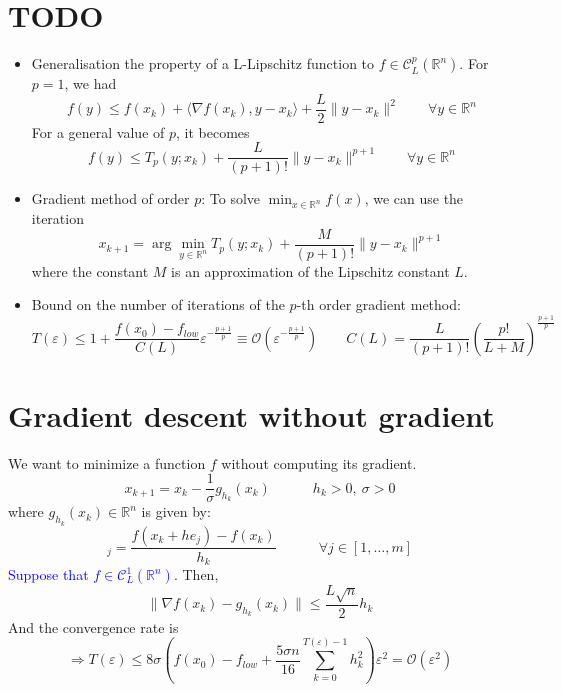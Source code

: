 \documentclass[12pt, openany]{report}
\newcommand{\R}{\mathbb{R}}
\newcommand{\C}{\mathcal{C}}
\renewcommand{\O}{\mathcal{O}}
\theoremstyle{definition}
\begin{document}
\section{TODO}
\begin{itemize}
	\item Generalisation the property of a L-Lipschitz function to $f\in \C_L^p(\R^n)$. For $p=1$, we had 
	\begin{equation}
		f(y)\le f(x_k) + \langle \nabla f(x_k),y-x_k\rangle + \frac{L}{2}\lVert y-x_k\rVert^2 \qquad \forall y\in \R^n 
	\end{equation}
	For a general value of $p$, it becomes 
	\begin{equation}
		f(y) \le T_p(y;x_k) + \frac{L}{(p+1)!}\lVert y-x_k\rVert^{p+1} \qquad \forall y\in \R^n 
	\end{equation}
	\item Gradient method of order $p$: To solve $\min_{x\in \R^n} f(x)$, we can use the iteration 
	\begin{equation}
		x_{k+1} = \arg\min_{y\in \R^n} T_p(y;x_k)+\frac{M}{(p+1)!}\lVert y-x_k\rVert^{p+1}
	\end{equation}
	where the constant $M$ is an approximation of the Lipschitz constant $L$. 
	\item Bound on the number of iterations of the $p$-th order gradient method:
	\begin{equation}
		T(\varepsilon) \le 1 + \frac{f(x_0)-f_{low}}{C(L)} \varepsilon^{-\frac{p+1}{p}} \equiv \O\left(\varepsilon^{-\frac{p+1}{p}}\right) \qquad C(L) = \frac{L}{(p+1)!}\left(\frac{p!}{L+M}\right)^{\frac{p+1}{p}}
	\end{equation} 
\end{itemize}
\section{Gradient descent without gradient}
We want to minimize a function $f$ without computing its gradient.
\begin{equation}
	x_{k+1} = x_k - \frac{1}{\sigma} g_{h_k}(x_k) \quad \quad \quad h_k > 0, \: \sigma > 0
\end{equation}
where $g_{h_k}(x_k) \in \R^n$ is given by:
\begin{equation}
	[g_{h_k}(x_k)]_j = \frac{f(x_k+he_j)-f(x_k)}{h_k} \quad \quad \quad \forall j\in [1,\dots,m]
\end{equation}
\textcolor{blue}{Suppose that $f\in \C^1_L(\R^n)$}. Then,
\begin{equation}
	\|\nabla f(x_k) - g_{h_k}(x_k)\| \leq \frac{L \sqrt{n}}{2} h_k
\end{equation}
And the convergence rate is 
\begin{equation}
	\Longrightarrow T(\varepsilon) \leq 8 \sigma \left( f(x_0) - f_{low} + \frac{5 \sigma n}{16} \sum_{k=0}^{T(\varepsilon)-1} h_k^2\right) \varepsilon^2 = \O(\varepsilon^2)
\end{equation}
\end{document}
